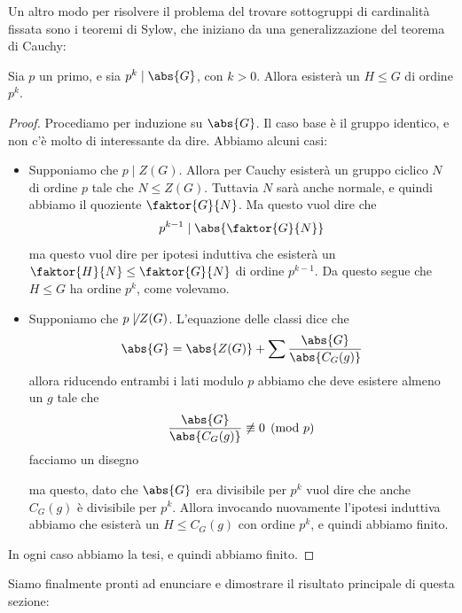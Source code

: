 \documentclass[11pt]{scrartcl}
\begin{document}
	 Un altro modo per risolvere il problema del trovare sottogruppi di cardinalità fissata sono i teoremi di Sylow, che iniziano da una generalizzazione del teorema di Cauchy: 
	 \begin{theorem}
	 	Sia $p$ un primo, e sia $p^k\mid \abs{G}$, con $k>0$. Allora esisterà un $H\le G$ di ordine $p^k$.
	 \end{theorem}
	 \begin{proof}
	 	Procediamo per induzione su $\abs{G}$. Il caso base è il gruppo identico, e non c'è molto di interessante da dire. Abbiamo alcuni casi:
	 	\begin{itemize}
	 		\item Supponiamo che $p\mid Z(G)$. Allora per Cauchy esisterà un gruppo ciclico $N$ di ordine $p$ tale che $N\le Z(G)$. Tuttavia $N$ sarà anche normale, e quindi abbiamo il quoziente $\faktor{G}{N}$. Ma questo vuol dire che
	 		$$p^{k-1}\mid \abs{\faktor{G}{N}}$$
	 		ma questo vuol dire per ipotesi induttiva che esisterà un $\faktor{H}{N}\le \faktor{G}{N}$ di ordine $p^{k-1}$. Da questo segue che $H\le G$ ha ordine $p^k$, come volevamo.
	 		\item Supponiamo che $p\not\mid Z(G)$. L'equazione delle classi dice che
	 		$$\abs{G}=\abs{Z(G)}+\sum \frac{\abs{G}}{\abs{C_G(g)}}$$
	 		allora riducendo entrambi i lati modulo $p$ abbiamo che deve esistere almeno un $g$ tale che
	 		$$\frac{\abs{G}}{\abs{C_G(g)}}\not\equiv 0 \pmod{p}$$
	 		facciamo un disegno
	 		\begin{center}
	 		\end{center}
	 		ma questo, dato che $\abs{G}$ era divisibile per $p^k$ vuol dire che anche $C_G(g)$ è divisibile per $p^k$. Allora invocando nuovamente l'ipotesi induttiva abbiamo che esisterà un $H\le C_G(g)$ con ordine $p^k$, e quindi abbiamo finito.
	 	\end{itemize}
	 	In ogni caso abbiamo la tesi, e quindi abbiamo finito.
	 \end{proof}
	 Siamo finalmente pronti ad enunciare e dimostrare il risultato principale di questa sezione:
	 
\end{document}
